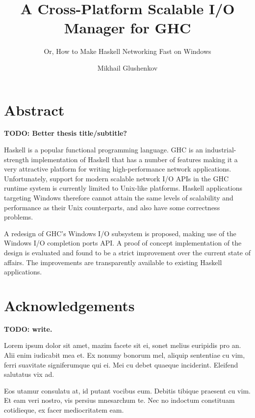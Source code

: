 \documentclass[a4paper,11pt,oneside]{report}
\title{A Cross-Platform Scalable I/O Manager for GHC}
\subtitle{Or, How to Make Haskell Networking Fast on Windows}
\author{Mikhail Glushenkov}
\begin{document}
\maketitle

\chapter*{Abstract}

\textbf{TODO: Better thesis title/subtitle?}

Haskell is a popular functional programming language. GHC is an
industrial-strength implementation of Haskell that has a number of features
making it a very attractive platform for writing high-performance network
applications. Unfortunately, support for modern scalable network I/O APIs in the
GHC runtime system is currently limited to Unix-like platforms. Haskell
applications targeting Windows therefore cannot attain the same levels of
scalability and performance as their Unix counterparts, and also have some
correctness problems.

A redesign of GHC's Windows I/O subsystem is proposed, making use of the Windows
I/O completion ports API. A proof of concept implementation of the design is
evaluated and found to be a strict improvement over the current state of
affairs. The improvements are transparently available to existing Haskell
applications.

\pagebreak

\chapter*{Acknowledgements}

\textbf{TODO: write.}

Lorem ipsum dolor sit amet, mazim facete sit ei, sonet melius euripidis pro
an. Alii enim iudicabit mea et. Ex nonumy bonorum mel, aliquip sententiae cu
vim, ferri suavitate signiferumque qui ei. Mei cu debet quaeque
inciderint. Eleifend salutatus vix ad.

Eos utamur consulatu at, id putant vocibus eum. Debitis tibique praesent cu
vim. Et eam veri nostro, vis persius mnesarchum te. Nec no indoctum constituam
cotidieque, ex facer mediocritatem eam.

\pagebreak


\tableofcontents

\pagebreak

\pagestyle{fancy}
\setcounter{page}{1}
\setcounter{chapter}{-1}
\end{document}
